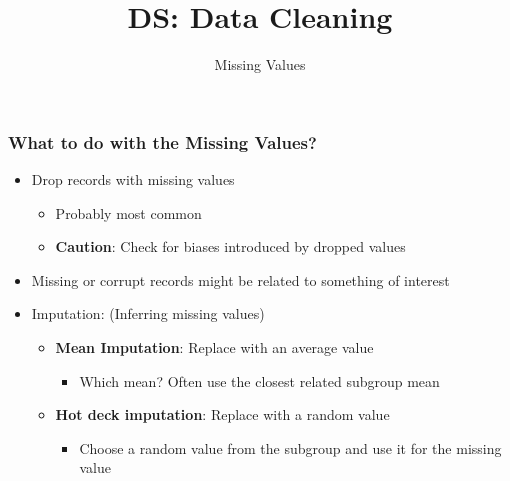 \documentclass[aspectratio=169]{../latex_main/tntbeamer}  %
\title[Missing Values]{DS: Data Cleaning}
\subtitle{Missing Values}
\begin{document}
	
	\maketitle
 
\begin{frame}
\frametitle{What to do with the Missing Values?}

\begin{itemize}
    \item Drop records with missing values
    \begin{itemize}
        \item Probably most common
        \item \textbf{Caution}: Check for biases introduced by dropped values
    \end{itemize}
    \item Missing or corrupt records might be related to something of interest
    \item Imputation: (Inferring missing values)
    \begin{itemize}
        \item \textbf{Mean Imputation}: Replace with an average value
        \begin{itemize}
            \item Which mean? Often use the closest related subgroup mean
        \end{itemize}
        \item \textbf{Hot deck imputation}: Replace with a random value
        \begin{itemize}
            \item Choose a random value from the subgroup and use it for the missing value
        \end{itemize}
        
    \end{itemize}
\end{itemize}

\end{frame}
\end{document}
